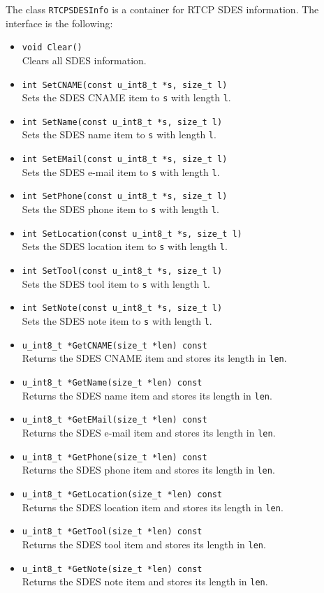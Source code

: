 \documentclass[12pt,a4paper]{article}
\begin{document}
				The class {\tt RTCPSDESInfo} is a container for RTCP SDES
				information. The interface is the following:
				\begin{itemize}
					\item {\tt void Clear()}\\
						Clears all SDES information.
					\item {\tt int SetCNAME(const u\_int8\_t *s, size\_t l)}\\
						Sets the SDES CNAME item to {\tt s} with length {\tt l}.
					\item {\tt int SetName(const u\_int8\_t *s, size\_t l)}\\
						Sets the SDES name item to {\tt s} with length {\tt l}.
					\item {\tt int SetEMail(const u\_int8\_t *s, size\_t l)}\\
						Sets the SDES e-mail item to {\tt s} with length {\tt l}.
					\item {\tt int SetPhone(const u\_int8\_t *s, size\_t l)}\\
						Sets the SDES phone item to {\tt s} with length {\tt l}.
					\item {\tt int SetLocation(const u\_int8\_t *s, size\_t l)}\\
						Sets the SDES location item to {\tt s} with length {\tt l}.
					\item {\tt int SetTool(const u\_int8\_t *s, size\_t l)}\\
						Sets the SDES tool item to {\tt s} with length {\tt l}.
					\item {\tt int SetNote(const u\_int8\_t *s, size\_t l)}\\
						Sets the SDES note item to {\tt s} with length {\tt l}.
					\item {\tt u\_int8\_t *GetCNAME(size\_t *len) const}\\
						Returns the SDES CNAME item and stores its length in {\tt len}.
					\item {\tt u\_int8\_t *GetName(size\_t *len) const}\\
						Returns the SDES name item and stores its length in {\tt len}.
					\item {\tt u\_int8\_t *GetEMail(size\_t *len) const}\\
						Returns the SDES e-mail item and stores its length in {\tt len}.
					\item {\tt u\_int8\_t *GetPhone(size\_t *len) const}\\
						Returns the SDES phone item and stores its length in {\tt len}.
					\item {\tt u\_int8\_t *GetLocation(size\_t *len) const}\\
						Returns the SDES location item and stores its length in {\tt len}.
					\item {\tt u\_int8\_t *GetTool(size\_t *len) const}\\
						Returns the SDES tool item and stores its length in {\tt len}.
					\item {\tt u\_int8\_t *GetNote(size\_t *len) const }\\
						Returns the SDES note item and stores its length in {\tt len}.
				\end{itemize}
\end{document}
